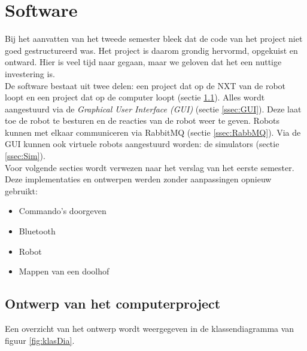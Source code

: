 \documentclass[tt2]{penoverslag}
\begin{document}
\section{Software}
\label{secc:softw}

Bij het aanvatten van het tweede semester bleek dat de code van het project niet goed gestructureerd was. Het project is daarom grondig hervormd, opgekuist en ontward. Hier is veel tijd naar gegaan, maar we geloven dat het een nuttige investering is.\\

De software bestaat uit twee delen: een project dat op de NXT van de robot loopt en een project dat op de computer loopt (sectie \ref{ssec:Sdesign}). Alles wordt aangestuurd via de \textit{Graphical User Interface (GUI)} (sectie \ref{ssec:GUI}). Deze laat toe de robot te besturen en de reacties van de robot weer te geven. Robots kunnen met elkaar communiceren via RabbitMQ (sectie \ref{ssec:RabbMQ}). Via de GUI kunnen ook virtuele robots aangestuurd worden: de simulators (sectie \ref{ssec:Sim}).\\

Voor volgende secties wordt verwezen naar het verslag van het eerste semester. Deze implementaties en ontwerpen werden zonder aanpassingen opnieuw gebruikt:

\begin{itemize}
\item Commando's doorgeven
\item Bluetooth
\item Robot
\item Mappen van een doolhof
\end{itemize}

\subsection{Ontwerp van het computerproject}
\label{ssec:Sdesign}
Een overzicht van het ontwerp wordt weergegeven in de klassendiagramma van figuur \ref{fig:klasDia}.\\
\end{document}
